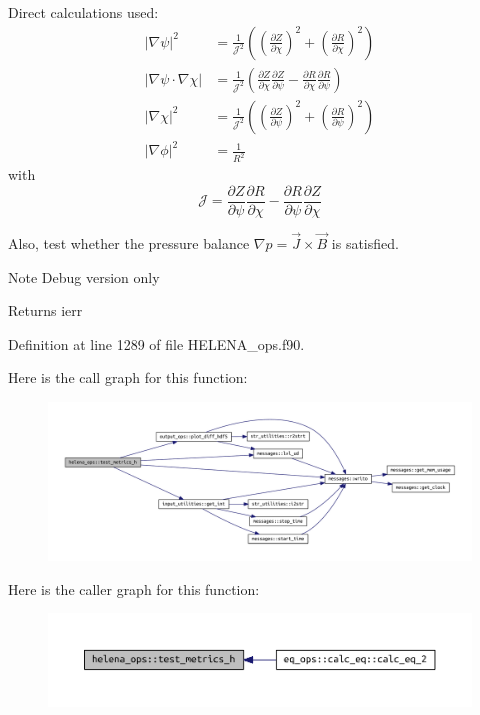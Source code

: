 Direct calculations used\+: \[\begin{aligned} \left|\nabla \psi\right|^2 &= \frac{1}{\mathcal{J}^2} \left(\left(\frac{\partial Z}{\partial \chi}\right)^2 + \left(\frac{\partial R}{\partial \chi}\right)^2\right) \\ \left|\nabla \psi \cdot \nabla \chi\right| &= \frac{1}{\mathcal{J}^2} \left( \frac{\partial Z}{\partial \chi} \frac{\partial Z}{\partial \psi} - \frac{\partial R}{\partial \chi} \frac{\partial R}{\partial \psi} \right) \\ \left|\nabla \chi\right|^2 &= \frac{1}{\mathcal{J}^2} \left(\left(\frac{\partial Z}{\partial \psi}\right)^2 + \left(\frac{\partial R}{\partial \psi}\right)^2\right) \\ \left|\nabla \phi\right|^2 &= \frac{1}{R^2} \end{aligned}\] with \[\mathcal{J} = \frac{\partial Z}{\partial \psi} \frac{\partial R}{\partial \chi} - \frac{\partial R}{\partial \psi} \frac{\partial Z}{\partial \chi}\]

Also, test whether the pressure balance $\nabla p = \vec{J}\times\vec{B} $ is satisfied.

\begin{DoxyNote}{Note}
Debug version only
\end{DoxyNote}
\begin{DoxyReturn}{Returns}
ierr 
\end{DoxyReturn}


Definition at line 1289 of file H\+E\+L\+E\+N\+A\+\_\+ops.\+f90.

Here is the call graph for this function\+:\nopagebreak
\begin{figure}[H]
\begin{center}
\leavevmode
\includegraphics[width=350pt]{namespacehelena__ops_a0f156b3653264fb016d6d311eb59114c_cgraph}
\end{center}
\end{figure}
Here is the caller graph for this function\+:\nopagebreak
\begin{figure}[H]
\begin{center}
\leavevmode
\includegraphics[width=350pt]{namespacehelena__ops_a0f156b3653264fb016d6d311eb59114c_icgraph}
\end{center}
\end{figure}
